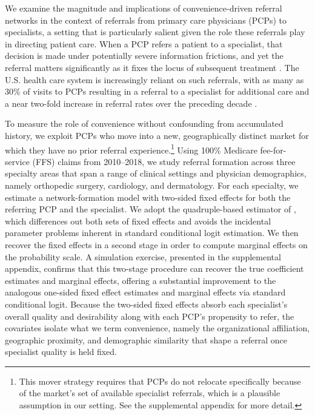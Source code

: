 \documentclass[12pt]{article}
\begin{document}
We examine the magnitude and implications of convenience-driven referral networks in the context of referrals from primary care physicians (PCPs) to specialists, a setting that is particularly salient given the role these referrals play in directing patient care. When a PCP refers a patient to a specialist, that decision is made under potentially severe information frictions, and yet the referral matters significantly as it fixes the locus of subsequent treatment \citep{chernew2021}. The U.S. health care system is increasingly reliant on such referrals, with as many as 30\% of visits to PCPs resulting in a referral to a specialist for additional care \citep{wright2022} and a near two-fold increase in referral rates over the preceding decade \citep{barnett2012aim, mehrotra2011}.

To measure the role of convenience without confounding from accumulated history, we exploit PCPs who move into a new, geographically distinct market for which they have no prior referral experience.\footnote{This mover strategy requires that PCPs do not relocate specifically because of the market's set of available specialist referrals, which is a plausible assumption in our setting. See the supplemental appendix for more detail.} Using 100\% Medicare fee-for-service (FFS) claims from 2010--2018, we study referral formation across three specialty areas that span a range of clinical settings and physician demographics, namely orthopedic surgery, cardiology, and dermatology. For each specialty, we estimate a network-formation model with two-sided fixed effects for both the referring PCP and the specialist. We adopt the quadruple-based estimator of \cite{jochmans2018}, which differences out both sets of fixed effects and avoids the incidental parameter problems inherent in standard conditional logit estimation. We then recover the fixed effects in a second stage in order to compute marginal effects on the probability scale. A simulation exercise, presented in the supplemental appendix, confirms that this two-stage procedure can recover the true coefficient estimates and marginal effects, offering a substantial improvement to the analogous one-sided fixed effect estimates and marginal effects via standard conditional logit. Because the two-sided fixed effects absorb each specialist's overall quality and desirability along with each PCP's propensity to refer, the covariates isolate what we term convenience, namely the organizational affiliation, geographic proximity, and demographic similarity that shape a referral once specialist quality is held fixed.
\end{document}
